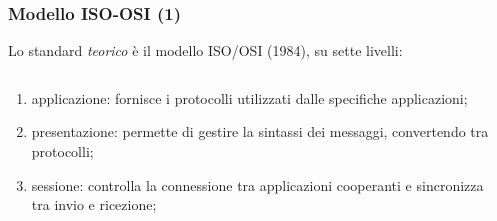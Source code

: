 \documentclass[]{beamer}
\begin{document}
\begin{frame}
\frametitle{Modello ISO-OSI (1)}
Lo standard \emph{teorico} è il modello ISO/OSI (1984), su \alert<1->{sette livelli}:\pause
\begin{columns}
\begin{column}{.55\textwidth}
  \begin{enumerate}
    \item \alert<2>{applicazione}: fornisce i protocolli utilizzati dalle specifiche applicazioni;\pause
    \item \alert<3>{presentazione}: permette di gestire la sintassi dei messaggi, convertendo tra protocolli;\pause
    \item \alert<4>{sessione}: controlla la connessione tra applicazioni cooperanti e sincronizza tra invio e ricezione;
  \end{enumerate}
\end{column}
\begin{column}{.45\textwidth}
\end{column}
\end{columns}
\end{frame}
\end{document}

